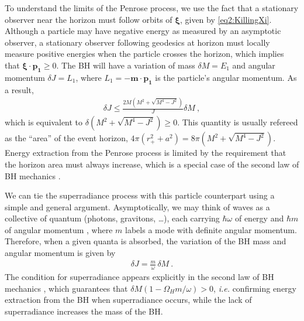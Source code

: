 To understand the limits of the Penrose process, we use the fact that a stationary observer near the horizon must follow orbits of $\bm{\xi}$, given by \eqref{eq2:KillingXi}. 
Although a particle may have negative energy as measured by an asymptotic observer, a stationary observer following geodesics at horizon must locally measure positive energies when the particle crosses the horizon, which implies that $\bm{\xi} \cdot \bm{p_1} \ge 0$.
The BH will have a variation of mass $\delta M = E_1$ and angular momentum $\delta J = L_1$, where $L_1 = - \bm{m} \cdot \bm{p_1}$ is the particle's angular momentum. As a result,
\begin{align}
    \label{eq2:penroseCondition}
    \delta J \le \frac{2M\left(M^2+\sqrt{M^4-J^2}\right)}{J} \delta M ~,
\end{align}
which is equivalent to $\delta \left(M^2+\sqrt{M^4-J^2}\right) \ge 0$. This quantity is usually refereed as the ``area'' of the event horizon, $4\pi(r_+^2+a^2)=8\pi\left(M^2+\sqrt{M^4-J^2}\right)$.
Energy extraction from the Penrose process is limited by the requirement that the horizon area must always increase, which is a special case of the second law of BH mechanics \cite{Hawking1973}. 

We can tie the superradiance process with this particle counterpart using a simple and general argument.
Asymptotically, we may think of waves as a collective of quantum (photons, gravitons, \dots), each carrying $\hbar \omega$ of energy and $\hbar m$ of angular momentum \cite{Bekenstein1973}, where $m$ labels a mode with definite angular momentum.
Therefore, when a given quanta is absorbed, the variation of the BH mass and angular momentum is given by
\begin{align}
    \label{eq2:spinMassRatio}
    \delta J = \frac{m}{\omega} \,\delta M ~.
\end{align}
The condition for superradiance  appears explicitly in the second law of BH mechanics , which guarantees that $\delta M (1 - \Omega_H m /\omega)>0$, \emph{i.e.} confirming energy extraction from the BH when superradiance occurs, while the lack of superradiance increases the mass of the BH.


\cleardoublepage